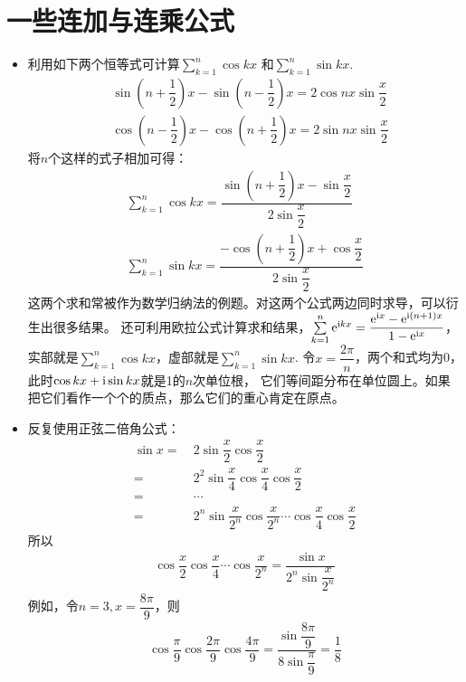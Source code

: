 \section{一些连加与连乘公式}
\begin{itemize}[leftmargin=\inteval{\myitemleftmargin}pt,itemsep=
   \inteval{\myitemitempsep}pt,topsep=\inteval{\myitemtopsep}pt]
\item 利用如下两个恒等式可计算$ \sum\limits_{k=1}^{n}\cos kx $
和$ \sum\limits_{k=1}^{n}\sin kx $. 
\begin{align*}
    &\sin\left( n+\dfrac{1}{2}\right) x-\sin\left( n-\dfrac{1}{2}\right) x=2\cos nx\sin \dfrac{x}{2} \\
    &\cos\left( n-\dfrac{1}{2}\right) x-\cos\left( n+\dfrac{1}{2}\right) x=2\sin nx\sin \dfrac{x}{2} 	 		
\end{align*}
将$ n $个这样的式子相加可得：
\begin{align}
    \sum_{k=1}^{n}\cos kx=\dfrac{\sin\left( n+\dfrac{1}{2}\right) x-\sin 
        \dfrac{x}{2}}{2\sin \dfrac{x}{2}} \label{余弦等差连加} \\
    \sum_{k=1}^{n}\sin kx=\dfrac{-\cos\left( n+\dfrac{1}{2}\right) x+\cos 
        \dfrac{x}{2}}{2\sin \dfrac{x}{2}}	\label{正弦等差连加}
\end{align}
这两个求和常被作为数学归纳法的例题。对这两个公式两边同时求导，可以衍生出很多结果。
还可利用欧拉公式计算求和结果，$ \sum\limits_{k=1}^{n}\mathrm{e}^{\mathrm{i} kx}=\dfrac{\mathrm{e}^{\mathrm{i} x}-\mathrm{e}^{\mathrm{i}(n+1)x}}{1-\mathrm{e}^{\mathrm{i} x}} $，
实部就是$ \sum\limits_{k=1}^{n}\cos kx $，虚部就是$ \sum\limits_{k=1}^{n}\sin kx $. 
令$ x=\dfrac{2\pi}{n} $，两个和式均为0，此时$ \cos kx+\mathrm{i}\sin kx $就是1的$ n $次单位根，
它们等间距分布在单位圆上。如果把它们看作一个个的质点，那么它们的重心肯定在原点。

\item 反复使用正弦二倍角公式：
\begin{align*}
    \sin x =&\ 2\sin\dfrac{x}{2} \cos\dfrac{x}{2} \\
    =&\ 2^2 \sin\dfrac{x}{4} \cos\dfrac{x}{4}  \cos\dfrac{x}{2} \\
    =&\  \cdots \\
    =&\  2^n \sin\dfrac{x}{2^n}\cos\dfrac{x}{2^n} \cdots \cos\dfrac{x}{4}\cos\dfrac{x}{2}     
\end{align*}
所以
\begin{align}\label{余弦等比连乘}
    \cos\dfrac{x}{2} \cos\dfrac{x}{4}\cdots  \cos\dfrac{x}{2^n}
    =\dfrac{\sin x}{2^n \sin\dfrac{x}{2^n}}
\end{align}
例如，令$ n=3,x=\dfrac{8\pi}{9} $，则
\begin{align*}
    \cos\dfrac{\pi}{9}\cos\dfrac{2\pi}{9}\cos\dfrac{4\pi}{9}
    =\dfrac{\sin\dfrac{8\pi}{9}}{8\sin\dfrac{\pi}{9}}=\dfrac{1}{8}
\end{align*}


\end{itemize}
